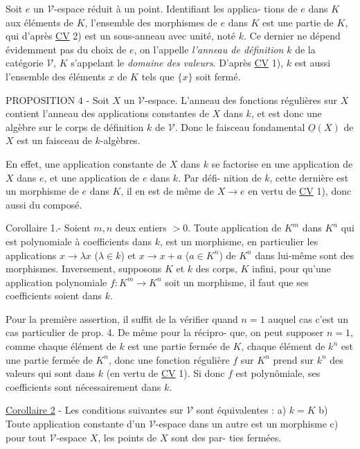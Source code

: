 Soit $e$ un $\mathcal{V}$-espace réduit à un point. Identifiant les applica-
tions de $e$ dans $K$ aux éléments de $K$, l'ensemble des morphismes de $e$
dans $K$ est une partie de $K$, qui d'après \underline{CV} 2) est un sous-anneau avec
unité, noté $k$. Ce dernier ne dépend évidemment pas du choix de $e$, on
l'appelle \emph{l'anneau de définition} $k$ de la catégorie $\mathcal{V}$, $K$ s'appelant le
\emph{domaine des valeurs}. D'après \underline{CV} 1), $k$ est aussi l'ensemble des éléments
$x$ de $K$ tels que $\{x\}$ soit fermé.

PROPOSITION 4 - Soit $X$ un $\mathcal{V}$-espace. L'anneau des fonctions régulières
sur $X$ contient l'anneau des applications constantes de $X$ dans $k$, et est
donc une algèbre sur le corps de définition $k$ de $\mathcal{V}$. Donc le faisceau
fondamental $\underline{O}(X)$ de $X$ est un faisceau de $k$-algèbres.

En effet, une application constante de $X$ dans $k$ se factorise en
une application de $X$ dans $e$, et une application de $e$ dans $k$. Par défi-
nition de $k$, cette dernière est un morphisme de $e$ dans $K$, il en est de
même de $X \to e$ en vertu de \underline{CV} 1), donc aussi du composé.

Corollaire 1.- Soient $m,n$ deux entiers $> 0$. Toute application de $K^m$
dans $K^n$ qui est polynomiale à coefficients dans $k$, est un morphisme, en
particulier les applications $x \to \lambda x$ ($\lambda \in k$) et $x \to x+a$ ($a \in K^n$) de $K^n$
dans lui-même sont des morphismes. Inversement, supposons $K$ et $k$ des
corps, $K$ infini, pour qu'une application polynomiale $f: K^m \to K^n$ soit un
morphisme, il faut que ses coefficients soient dans $k$.

\newpage



Pour la première assertion, il suffit de la vérifier quand $n=1$
auquel cas c'est un cas particulier de prop. 4. De même pour la récipro-
que, on peut supposer $n=1$, comme chaque élément de $k$ est une partie
fermée de $K$, chaque élément de $k^n$ est une partie fermée de $K^n$, donc une
fonction régulière $f$ sur $K^n$ prend sur $k^n$ des valeurs qui sont dans $k$
(en vertu de \underline{CV} 1). Si donc $f$ est polynômiale, ses coefficients sont
nécessairement dans $k$.

\underline{Corollaire 2} - Les conditions suivantes sur $\mathcal{V}$ sont équivalentes :
a) $k=K$ b) Toute application constante d'un $\mathcal{V}$-espace dans un autre est
un morphisme c) pour tout $\mathcal{V}$-espace $X$, les points de $X$ sont des par-
ties fermées.

